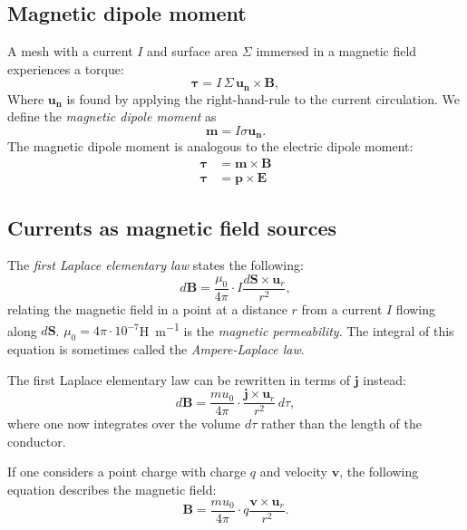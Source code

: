 \documentclass[a4paper, 12pt]{article}
\renewcommand{\vec}[1]{\mathbf{#1}}
\newcommand{\E}{\ensuremath{\vec{E}}}
\renewcommand{\j}{\ensuremath{\vec{j}}}
\newcommand{\B}{\ensuremath{\vec{B}}}
\begin{document}
    \subsection{Magnetic dipole moment}
    
        A mesh with a current $I$ and surface area $\Sigma$ immersed in a magnetic field experiences a torque:
        \begin{equation}
            \vec{\tau} = I\,\Sigma\,\vec{u_n}\times\B,
        \end{equation}
        Where $\vec{u_n}$ is found by applying the right-hand-rule to the current circulation. We define the \textit{magnetic dipole moment} as
        \begin{equation}
            \vec{m} = I\sigma\vec{u_n}.
        \end{equation}
        The magnetic dipole moment is analogous to the electric dipole moment: 
        \begin{align*}
            \vec{\tau} &= \vec{m} \times \B\\
            \vec{\tau} &= \vec{p} \times \E
        \end{align*}
    
    \subsection{Currents as magnetic field sources}
    
        The \textit{first Laplace elementary law} states the following:
        \begin{equation}
            d\B = \frac{\mu_0}{4\pi}\cdot I\frac{d\vec{S}\times\vec{u}_r}{r^2},
        \end{equation}
        relating the magnetic field in a point at a distance $r$ from a current $I$ flowing along $d\vec{S}$.
        $\mu_0 = 4\pi\cdot 10^{-7}$\si{\henry\per\metre}  is the \textit{magnetic permeability}. 
        The integral of this equation is sometimes called the \textit{Ampere-Laplace law}.

        The first Laplace elementary law can be rewritten in terms of \j{} instead:
        \begin{equation}
            d\B = \frac{mu_0}{4\pi}\cdot \frac{\j\times\vec{u}_r}{r^2}\,d\tau,
        \end{equation}
        where one now integrates over the volume $d\tau$ rather than the length of the conductor.

        If one considers a point charge with charge $q$ and velocity $\vec{v}$, the following equation describes the magnetic field:
        \begin{equation}
            \B = \frac{mu_0}{4\pi}\cdot q\frac{\vec{v}\times\vec{u}_r}{r^2}.
        \end{equation}
\end{document}

